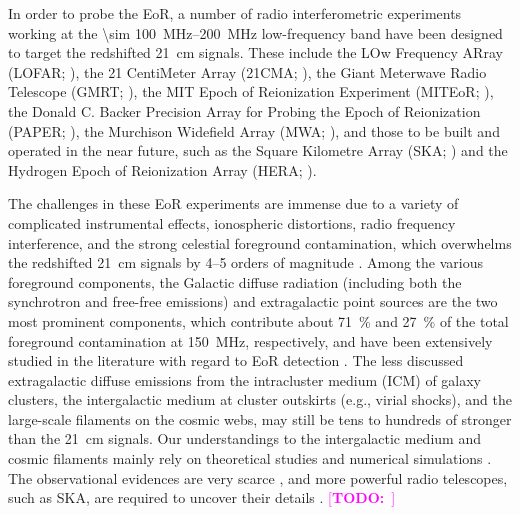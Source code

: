\documentclass[modern]{aastex62}
\newcommand{\TODO}[1]{\textcolor{magenta}{[\textbf{TODO:}~\uuline{#1}]}}
\begin{document}
In order to probe the EoR, a number of radio interferometric experiments
working at the \SIrange{\sim 100}{200}{\MHz} low-frequency band have been
designed to target the redshifted 21~cm signals.
These include the LOw Frequency ARray (LOFAR; \citealt{vanHaarlem2013}),
the 21 CentiMeter Array (21CMA; \citealt{zheng2016}),
the Giant Meterwave Radio Telescope (GMRT; \citealt{paciga2011}),
the MIT Epoch of Reionization Experiment (MITEoR; \citealt{zheng2014}),
the Donald C. Backer Precision Array for Probing the Epoch of
Reionization (PAPER; \citealt{parsons2010}),
the Murchison Widefield Array (MWA; \citealt{bowman2013,tingay2013}),
and those to be built and operated in the near future, such as the Square
Kilometre Array (SKA; \citealt{mellema2013rev,koopmans2015rev}) and
the Hydrogen Epoch of Reionization Array (HERA; \citealt{deboer2017}).

The challenges in these EoR experiments are immense
due to a variety of complicated instrumental effects,
ionospheric distortions, radio frequency interference, and the
strong celestial foreground contamination, which overwhelms the
redshifted 21~cm signals by \numrange{4}{5} orders of magnitude
\citep[e.g.,][]{beardsley2016,procopio2017}.
Among the various foreground components, the Galactic diffuse
radiation (including both the synchrotron and free-free emissions)
and extragalactic point sources are the two most prominent components,
which contribute about \SI{71}{\percent} and \SI{27}{\percent} of
the total foreground contamination at \SI{150}{\MHz}, respectively,
and have been extensively studied in the literature with regard to
EoR detection
\citep[e.g.,][]{shaver1999,diMatteo2004,gleser2008,liu2012,murray2017}.
The less discussed extragalactic diffuse emissions from the
intracluster medium (ICM) of galaxy clusters,
the intergalactic medium at cluster outskirts (e.g., virial shocks),
and the large-scale filaments on the cosmic webs,
may still be tens to hundreds of stronger than the 21~cm signals.
Our understandings to the intergalactic medium and cosmic filaments
mainly rely on theoretical studies \citep[e.g.][]{waxman2000,keshet2004}
and numerical simulations \citep[e.g.,][]{arayaMelo2012,vazza2015}.
The observational evidences are very scarce
\citep[e.g.,][]{eckert2015,keshet2017},
and more powerful radio telescopes, such as SKA, are required to uncover
their details \citep[e.g.,][]{vernstrom2017,kooistra2017}.
\TODO{update references}
\end{document}
